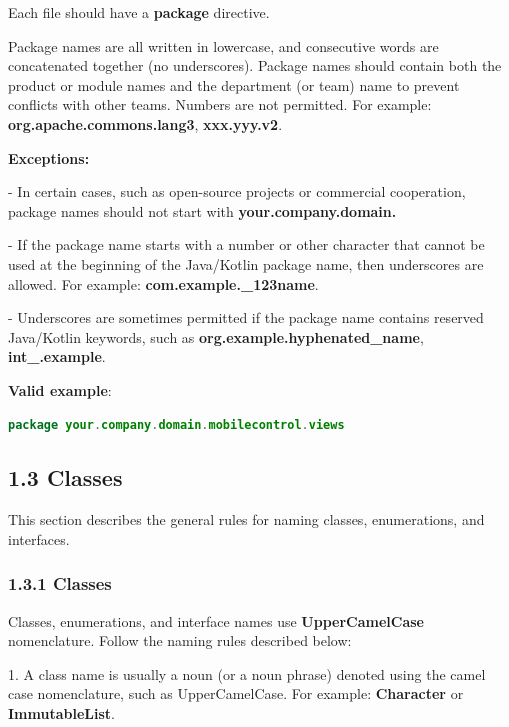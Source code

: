 {{{{{{{{{{{{Each file should have a \textbf{package} directive.

Package names are all written in lowercase, and consecutive words are concatenated together (no underscores). Package names should contain both the product or module names and the department (or team) name to prevent conflicts with other teams.  Numbers are not permitted. For example: \textbf{org.apache.commons.lang3}, \textbf{xxx.yyy.v2}.



\textbf{Exceptions:} 



- In certain cases, such as open-source projects or commercial cooperation, package names should not start with \textbf{your.company.domain.}

- If the package name starts with a number or other character that cannot be used at the beginning of the Java/Kotlin package name, then underscores are allowed. For example: \textbf{com.example._123name}.

- Underscores are sometimes permitted if the package name contains reserved Java/Kotlin keywords, such as \textbf{org.example.hyphenated_name}, \textbf{int_.example}.



\textbf{Valid example}: 

\begin{lstlisting}[language=Kotlin]
package your.company.domain.mobilecontrol.views
\end{lstlisting}


\subsection*{\textbf{1.3 Classes}}

\label{sec:1.3}

This section describes the general rules for naming classes, enumerations, and interfaces.

\subsubsection*{\textbf{1.3.1 Classes}}
\leavevmode\newline

\label{sec:1.3.1}

Classes, enumerations, and interface names use \textbf{UpperCamelCase} nomenclature. Follow the naming rules described below:

1.	A class name is usually a noun (or a noun phrase) denoted using the camel case nomenclature, such as UpperCamelCase. For example: \textbf{Character} or \textbf{ImmutableList}.

}}}}}}}}}}}}
